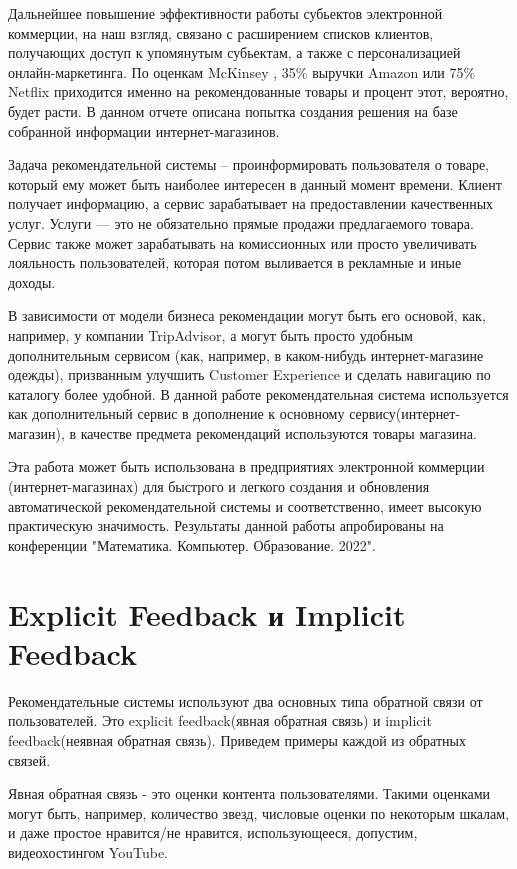 \documentclass[14pt]{mmcs_article}
\begin{document}
Дальнейшее повышение эффективности работы субьектов электронной коммерции, на наш взгляд, связано с расширением списков клиентов, получающих доступ к упомянутым субьектам, а также с персонализацией онлайн-маркетинга. По оценкам McKinsey \cite{INTRO:a1}, 35\% выручки Amazon или 75\% Netflix приходится именно на рекомендованные товары и процент этот, вероятно, будет расти. В данном отчете описана попытка создания решения на базе собранной информации интернет-магазинов. 

Задача рекомендательной системы – проинформировать пользователя о товаре, который ему может быть наиболее интересен в данный момент времени. Клиент получает информацию, а сервис зарабатывает на предоставлении качественных услуг. Услуги — это не обязательно прямые продажи предлагаемого товара. Сервис также может зарабатывать на комиссионных или просто увеличивать лояльность пользователей, которая потом выливается в рекламные и иные доходы.

В зависимости от модели бизнеса рекомендации могут быть его основой, как, например, у компании TripAdvisor, а могут быть просто удобным дополнительным сервисом (как, например, в каком-нибудь интернет-магазине одежды), призванным улучшить Customer Experience и сделать навигацию по каталогу более удобной. В данной работе рекомендательная система используется как дополнительный сервис в дополнение к основному сервису(интернет-магазин), в качестве предмета рекомендаций используются товары магазина. 

Эта работа может быть использована в предприятиях электронной коммерции (интернет-магазинах) для быстрого и легкого создания и обновления автоматической рекомендательной системы и соответственно, имеет высокую практическую значимость.
Результаты данной работы апробированы на конференции "Математика. Компьютер. Образование. 2022".

\newpage
\section{Explicit Feedback и Implicit Feedback}
Рекомендательные системы используют два основных типа обратной связи от пользователей. Это explicit feedback(явная обратная связь) и implicit feedback(неявная обратная связь). Приведем примеры каждой из обратных связей.

Явная обратная связь - это оценки контента пользователями. Такими оценками могут быть, например, количество звезд, числовые оценки по некоторым шкалам, и даже простое нравится/не нравится, использующееся, допустим, видеохостингом YouTube.
\end{document}
